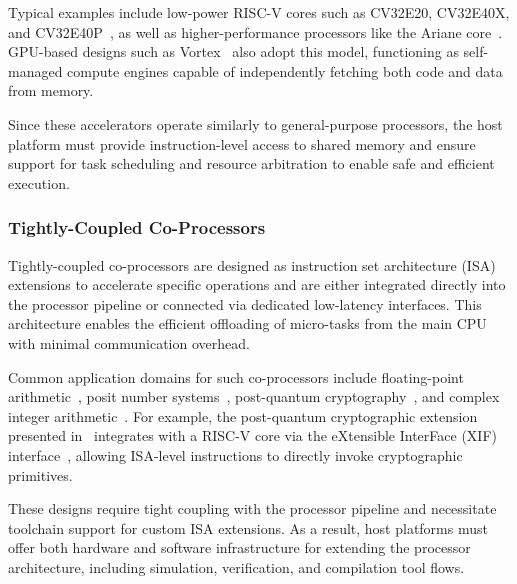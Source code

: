                 Typical examples include low-power RISC-V cores such as CV32E20, CV32E40X, and CV32E40P~\cite{zeroriscy}, as well as higher-performance processors like the Ariane core~\cite{ariane}. GPU-based designs such as Vortex~\cite{vortex} also adopt this model, functioning as self-managed compute engines capable of independently fetching both code and data from memory.
                
                Since these accelerators operate similarly to general-purpose processors, the host platform must provide instruction-level access to shared memory and ensure support for task scheduling and resource arbitration to enable safe and efficient execution.

            \subsubsection*{Tightly-Coupled Co-Processors}
            
                Tightly-coupled co-processors are designed as instruction set architecture (ISA) extensions to accelerate specific operations and are either integrated directly into the processor pipeline or connected via dedicated low-latency interfaces. This architecture enables the efficient offloading of micro-tasks from the main CPU with minimal communication overhead.
                
                Common application domains for such co-processors include floating-point arithmetic~\cite{fp}, posit number systems~\cite{posit}, post-quantum cryptography~\cite{pqcry}, and complex integer arithmetic~\cite{complex}. For example, the post-quantum cryptographic extension presented in~\cite{pqcry} integrates with a RISC-V core via the eXtensible InterFace (XIF) interface~\cite{xif}, allowing ISA-level instructions to directly invoke cryptographic primitives.
                
                These designs require tight coupling with the processor pipeline and necessitate toolchain support for custom ISA extensions. As a result, host platforms must offer both hardware and software infrastructure for extending the processor architecture, including simulation, verification, and compilation tool flows.

